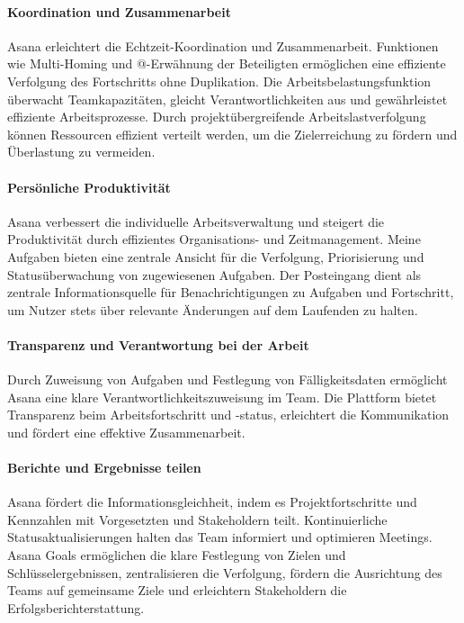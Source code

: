 \documentclass[sigconf, nonacm]{acmart}
\begin{document}
\paragraph{Koordination und Zusammenarbeit}
Asana erleichtert die Echtzeit-Koordination und Zusammenarbeit. Funktionen wie Multi-Homing und @-Erwähnung der Beteiligten ermöglichen eine effiziente Verfolgung des Fortschritts ohne Duplikation. Die Arbeitsbelastungsfunktion überwacht Teamkapazitäten, gleicht Verantwortlichkeiten aus und gewährleistet effiziente Arbeitsprozesse. Durch projektübergreifende Arbeitslastverfolgung können Ressourcen effizient verteilt werden, um die Zielerreichung zu fördern und Überlastung zu vermeiden.

\paragraph{Persönliche Produktivität}
Asana verbessert die individuelle Arbeitsverwaltung und steigert die Produktivität durch effizientes Organisations- und Zeitmanagement. Meine Aufgaben bieten eine zentrale Ansicht für die Verfolgung, Priorisierung und Statusüberwachung von zugewiesenen Aufgaben. Der Posteingang dient als zentrale Informationsquelle für Benachrichtigungen zu Aufgaben und Fortschritt, um Nutzer stets über relevante Änderungen auf dem Laufenden zu halten.

\paragraph{Transparenz und Verantwortung bei der Arbeit}
Durch Zuweisung von Aufgaben und Festlegung von Fälligkeitsdaten ermöglicht Asana eine klare Verantwortlichkeitszuweisung im Team. Die Plattform bietet Transparenz beim Arbeitsfortschritt und -status, erleichtert die Kommunikation und fördert eine effektive Zusammenarbeit.

\paragraph{Berichte und Ergebnisse teilen}
Asana fördert die Informationsgleichheit, indem es Projektfortschritte und Kennzahlen mit Vorgesetzten und Stakeholdern teilt. Kontinuierliche Statusaktualisierungen halten das Team informiert und optimieren Meetings. Asana Goals ermöglichen die klare Festlegung von Zielen und Schlüsselergebnissen, zentralisieren die Verfolgung, fördern die Ausrichtung des Teams auf gemeinsame Ziele und erleichtern Stakeholdern die Erfolgsberichterstattung.
\end{document}
